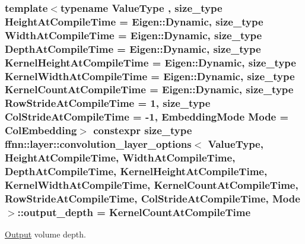 \hypertarget{structffnn_1_1layer_1_1convolution__layer__options_a5f03a7c3b15a4baf82477c5a095e5ace}{
\subsubsection[{output\-\_\-depth}]{\setlength{\rightskip}{0pt plus 5cm}template$<$typename Value\-Type , size\-\_\-type Height\-At\-Compile\-Time = Eigen\-::\-Dynamic, size\-\_\-type Width\-At\-Compile\-Time = Eigen\-::\-Dynamic, size\-\_\-type Depth\-At\-Compile\-Time = Eigen\-::\-Dynamic, size\-\_\-type Kernel\-Height\-At\-Compile\-Time = Eigen\-::\-Dynamic, size\-\_\-type Kernel\-Width\-At\-Compile\-Time = Eigen\-::\-Dynamic, size\-\_\-type Kernel\-Count\-At\-Compile\-Time = Eigen\-::\-Dynamic, size\-\_\-type Row\-Stride\-At\-Compile\-Time = 1, size\-\_\-type Col\-Stride\-At\-Compile\-Time = -\/1, Embedding\-Mode Mode = Col\-Embedding$>$ constexpr {\bf size\-\_\-type} {\bf ffnn\-::layer\-::convolution\-\_\-layer\-\_\-options}$<$ Value\-Type, Height\-At\-Compile\-Time, Width\-At\-Compile\-Time, Depth\-At\-Compile\-Time, Kernel\-Height\-At\-Compile\-Time, Kernel\-Width\-At\-Compile\-Time, Kernel\-Count\-At\-Compile\-Time, Row\-Stride\-At\-Compile\-Time, Col\-Stride\-At\-Compile\-Time, Mode $>$\-::output\-\_\-depth = Kernel\-Count\-At\-Compile\-Time\hspace{0.3cm}{\ttfamily [static]}}}\label{structffnn_1_1layer_1_1convolution__layer__options_a5f03a7c3b15a4baf82477c5a095e5ace}


\hyperlink{classffnn_1_1layer_1_1_output}{Output} volume depth. 

